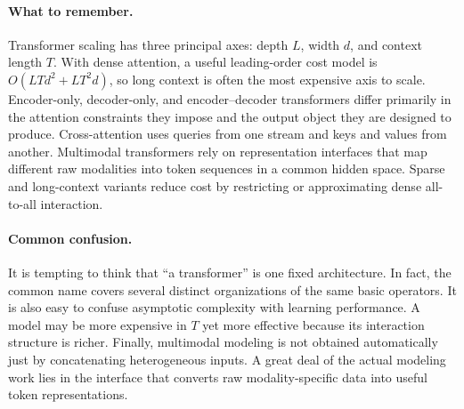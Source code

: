 \paragraph{What to remember.}
Transformer scaling has three principal axes: depth \(L\), width \(d\), and context length \(T\).
With dense attention, a useful leading-order cost model is \(O(LTd^2 + LT^2 d)\), so long context is often the most expensive axis to scale.
Encoder-only, decoder-only, and encoder--decoder transformers differ primarily in the attention constraints they impose and the output object they are designed to produce.
Cross-attention uses queries from one stream and keys and values from another.
Multimodal transformers rely on representation interfaces that map different raw modalities into token sequences in a common hidden space.
Sparse and long-context variants reduce cost by restricting or approximating dense all-to-all interaction.

\paragraph{Common confusion.}
It is tempting to think that ``a transformer'' is one fixed architecture.
In fact, the common name covers several distinct organizations of the same basic operators.
It is also easy to confuse asymptotic complexity with learning performance.
A model may be more expensive in \(T\) yet more effective because its interaction structure is richer.
Finally, multimodal modeling is not obtained automatically just by concatenating heterogeneous inputs.
A great deal of the actual modeling work lies in the interface that converts raw modality-specific data into useful token representations.

